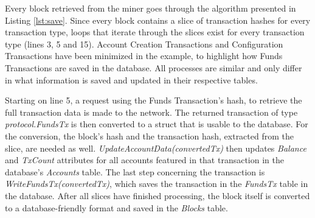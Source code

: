 Every block retrieved from the miner goes through the algorithm presented in Listing \ref{lst:save}. Since every block contains a slice of transaction hashes for every transaction type, loops that iterate through the slices exist for every transaction type (lines 3, 5 and 15). Account Creation Transactions and Configuration Transactions have been minimized in the example, to highlight how Funds Transactions are saved in the database. All processes are similar and only differ in what information is saved and updated in their respective tables.

Starting on line 5, a request using the Funds Transaction's hash, to retrieve the full transaction data is made to the network. The returned transaction of type \emph{protocol.FundsTx} is then converted to a struct that is usable to the database. For the conversion, the block's hash and the transaction hash, extracted from the slice, are needed as well. \emph{UpdateAccountData(convertedTx)} then updates \emph{Balance} and \emph{TxCount} attributes for all accounts featured in that transaction in the database's \emph{Accounts} table. The last step concerning the transaction is \emph{WriteFundsTx(convertedTx)}, which saves the transaction in the \emph{FundsTx} table in the database. After all slices have finished processing, the block itself is converted to a database-friendly format and saved in the \emph{Blocks} table.

